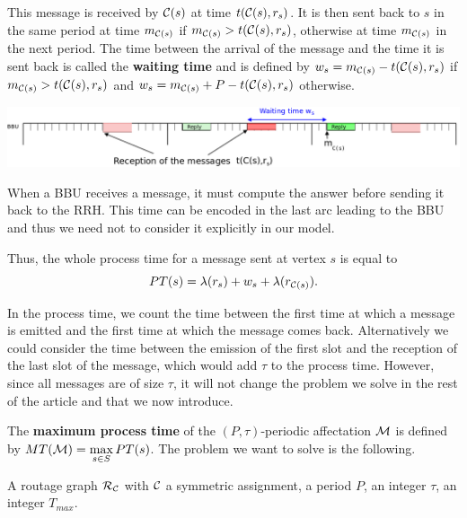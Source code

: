 \documentclass[a4paper,10pt]{article}
\begin{document}
      

      This message is received by ${\cal C}(s)$ at time $t({\cal C}(s),r_s)$. It is then sent back to $s$ in the same period at time $m_{{\cal C}(s)}$ if $m_{{\cal C}(s)} > t({\cal C}(s),r_s)$, otherwise at time $m_{{\cal C}(s)}$ in the next period. The time between the arrival of the message and the time it is sent back is called the \textbf{waiting time} and is defined by $w_s = m_{{\cal C}(s)} - t({\cal C}(s),r_s)$ if $m_{{\cal C}(s)} > t({\cal C}(s),r_s)$ and $w_s = m_{{\cal C}(s)} + P - t({\cal C}(s),r_s)$ otherwise.
      
       \begin{center}
      \includegraphics[scale=0.3]{BBU2.png}
      \end{center}
     

      When a BBU receives a message, it must compute the answer before sending it back to the RRH. This time can be encoded
      in the last arc leading to the BBU and thus we need not to consider it explicitly in our model.
    
      Thus, the whole process time for a message sent at vertex $s$ is equal to
      $$
      PT(s)=\lambda(r_s)+ w_s+\lambda(r_{{\cal C}(s)}).
      $$
      
      In the process time, we count the time between the first time at which a message is emitted and 
      the first time at which the message comes back. Alternatively we could consider the time between the emission of the first slot and the reception of the last slot of the message, which would add $\tau$ to the process time.
      However, since all messages are of size $\tau$, it will not change the problem we solve in the rest of the article and that we now introduce.
      
    The {\bf maximum process time} of the $(P,\tau)$-periodic affectation ${\cal M} $ is defined by $MT({\cal M})=\max\limits_{s \in S} PT(s)$. The problem we want to solve is the following. 


        A routage graph ${\cal R}_{\cal C}$ with ${\cal C}$ a symmetric assignment, a period $P$, an integer $\tau$, an integer $T_{max}$.
\end{document}
